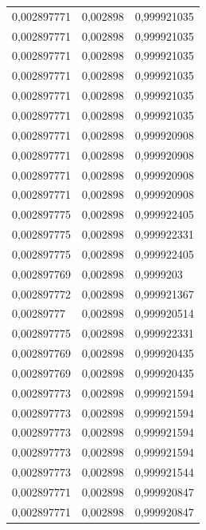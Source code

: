 \begin{center}
\begin{longtable}{|l|l|l|}
0,002897771        & 0,002898              & 0,999921035  \\
0,002897771        & 0,002898              & 0,999921035  \\
0,002897771        & 0,002898              & 0,999921035  \\
0,002897771        & 0,002898              & 0,999921035  \\
0,002897771        & 0,002898              & 0,999921035  \\
0,002897771        & 0,002898              & 0,999921035  \\
0,002897771        & 0,002898              & 0,999920908  \\
0,002897771        & 0,002898              & 0,999920908  \\
0,002897771        & 0,002898              & 0,999920908  \\
0,002897771        & 0,002898              & 0,999920908  \\
0,002897775        & 0,002898              & 0,999922405  \\
0,002897775        & 0,002898              & 0,999922331  \\
0,002897775        & 0,002898              & 0,999922405  \\
0,002897769        & 0,002898              & 0,9999203    \\
0,002897772        & 0,002898              & 0,999921367  \\
0,00289777         & 0,002898              & 0,999920514  \\
0,002897775        & 0,002898              & 0,999922331  \\
0,002897769        & 0,002898              & 0,999920435  \\
0,002897769        & 0,002898              & 0,999920435  \\
0,002897773        & 0,002898              & 0,999921594  \\
0,002897773        & 0,002898              & 0,999921594  \\
0,002897773        & 0,002898              & 0,999921594  \\
0,002897773        & 0,002898              & 0,999921594  \\
0,002897773        & 0,002898              & 0,999921544  \\
0,002897771        & 0,002898              & 0,999920847  \\
0,002897771        & 0,002898              & 0,999920847  \\

\end{longtable}
\end{center}
